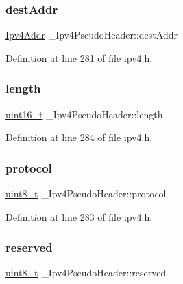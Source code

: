 \subsubsection{\texorpdfstring{dest\+Addr}{destAddr}}
{\footnotesize\ttfamily \hyperlink{ipv4_8h_a411debb3d770caa0c06d3f73367da37f}{Ipv4\+Addr} \+\_\+\+Ipv4\+Pseudo\+Header\+::dest\+Addr}



Definition at line 281 of file ipv4.\+h.

\mbox{\label{struct__Ipv4PseudoHeader_a2ab9f4dca10bae4886febdafef0d40b9}} 
\subsubsection{\texorpdfstring{length}{length}}
{\footnotesize\ttfamily \hyperlink{stdint_8h_a273cf69d639a59973b6019625df33e30}{uint16\+\_\+t} \+\_\+\+Ipv4\+Pseudo\+Header\+::length}



Definition at line 284 of file ipv4.\+h.

\mbox{\label{struct__Ipv4PseudoHeader_ae93c51d6bf3425cd5389a04ad39dbc14}} 
\subsubsection{\texorpdfstring{protocol}{protocol}}
{\footnotesize\ttfamily \hyperlink{stdint_8h_aba7bc1797add20fe3efdf37ced1182c5}{uint8\+\_\+t} \+\_\+\+Ipv4\+Pseudo\+Header\+::protocol}



Definition at line 283 of file ipv4.\+h.

\mbox{\label{struct__Ipv4PseudoHeader_a29142e7c1fa3f42b5d30c8a478004dc0}} 
\subsubsection{\texorpdfstring{reserved}{reserved}}
{\footnotesize\ttfamily \hyperlink{stdint_8h_aba7bc1797add20fe3efdf37ced1182c5}{uint8\+\_\+t} \+\_\+\+Ipv4\+Pseudo\+Header\+::reserved}



